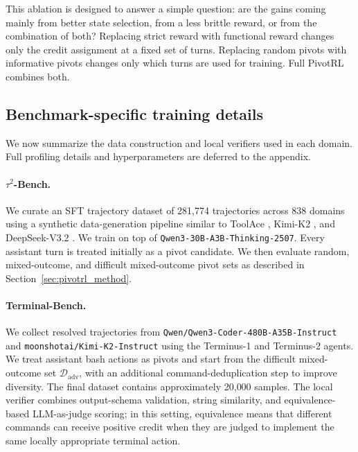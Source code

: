 This ablation is designed to answer a simple question: are the gains coming mainly from better state selection, from a less brittle reward, or from the combination of both? Replacing strict reward with functional reward changes only the credit assignment at a fixed set of turns. Replacing random pivots with informative pivots changes only which turns are used for training. Full PivotRL combines both.

\subsection{Benchmark-specific training details}
\label{sec:benchmark_specific_details}

We now summarize the data construction and local verifiers used in each domain. Full profiling details and hyperparameters are deferred to the appendix.

\paragraph{$\tau^2$-Bench.}
We curate an SFT trajectory dataset of 281{,}774 trajectories across 838 domains using a synthetic data-generation pipeline similar to ToolAce \citep{liu2025toolacewinningpointsllm}, Kimi-K2 \citep{kimiteam2025kimik2openagentic}, and DeepSeek-V3.2 \citep{deepseekai2025deepseekv32pushingfrontieropen}. We train on top of \texttt{Qwen3-30B-A3B-Thinking-2507}. Every assistant turn is treated initially as a pivot candidate. We then evaluate random, mixed-outcome, and difficult mixed-outcome pivot sets as described in Section~\ref{sec:pivotrl_method}.

\paragraph{Terminal-Bench.}
We collect resolved trajectories from \texttt{Qwen/Qwen3-Coder-480B-A35B-Instruct} and \texttt{moonshotai/Kimi-K2-Instruct} using the Terminus-1 and Terminus-2 agents. We treat assistant bash actions as pivots and start from the difficult mixed-outcome set $\mathcal{D}_{\mathrm{adv}}$, with an additional command-deduplication step to improve diversity. The final dataset contains approximately 20{,}000 samples. The local verifier combines output-schema validation, string similarity, and equivalence-based LLM-as-judge scoring; in this setting, equivalence means that different commands can receive positive credit when they are judged to implement the same locally appropriate terminal action.

